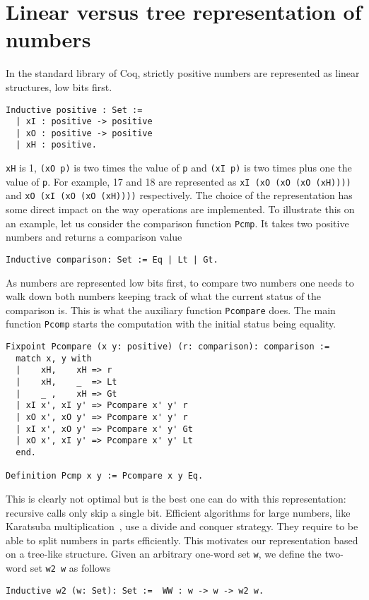 \section{Linear versus tree representation of numbers\label{ZTree}}

In the standard library of {\sc Coq}, strictly positive numbers are represented as linear structures, low bits first.

\begin{verbatim}
Inductive positive : Set :=
  | xI : positive -> positive 
  | xO : positive -> positive 
  | xH : positive.
\end{verbatim}
 {\tt xH} is 1, {\tt (xO p)} is two times the value of {\tt p}
 and {\tt (xI p)} is two times plus one the value of {\tt p}.
For example, 17 and 18 are represented as {\tt xI (xO (xO (xO (xH))))} and
{\tt xO (xI (xO (xO (xH))))} respectively. The choice of the representation
has some direct impact on the way operations are implemented. To illustrate this on an example,
let us consider the comparison function {\tt Pcmp}. It takes two positive numbers
and returns a comparison value
\begin{verbatim}
Inductive comparison: Set := Eq | Lt | Gt.
\end{verbatim}
As numbers are represented low bits first, to compare two numbers 
one needs to walk down both numbers keeping track of what the current status
of the comparison is. This is what the auxiliary function {\tt Pcompare} does. The main 
function {\tt Pcomp} starts the computation with the initial status being equality.
\begin{verbatim}
Fixpoint Pcompare (x y: positive) (r: comparison): comparison :=
  match x, y with
  |    xH,    xH => r
  |    xH,    _  => Lt
  |    _ ,    xH => Gt
  | xI x', xI y' => Pcompare x' y' r
  | xO x', xO y' => Pcompare x' y' r
  | xI x', xO y' => Pcompare x' y' Gt
  | xO x', xI y' => Pcompare x' y' Lt
  end.
  
Definition Pcmp x y := Pcompare x y Eq.
\end{verbatim}
This is clearly not optimal but is the best one can do with this 
representation: recursive calls only skip a single bit. 
Efficient algorithms for large numbers, like Karatsuba multiplication~\cite{Karat}, 
use a divide and conquer strategy. They require to be able to split numbers in parts efficiently. 
This motivates our representation based on a tree-like structure. 
Given an arbitrary one-word set {\tt w}, we define the two-word  set {\tt w2 w} as follows 
\begin{verbatim}
Inductive w2 (w: Set): Set :=  WW : w -> w -> w2 w.
\end{verbatim}
